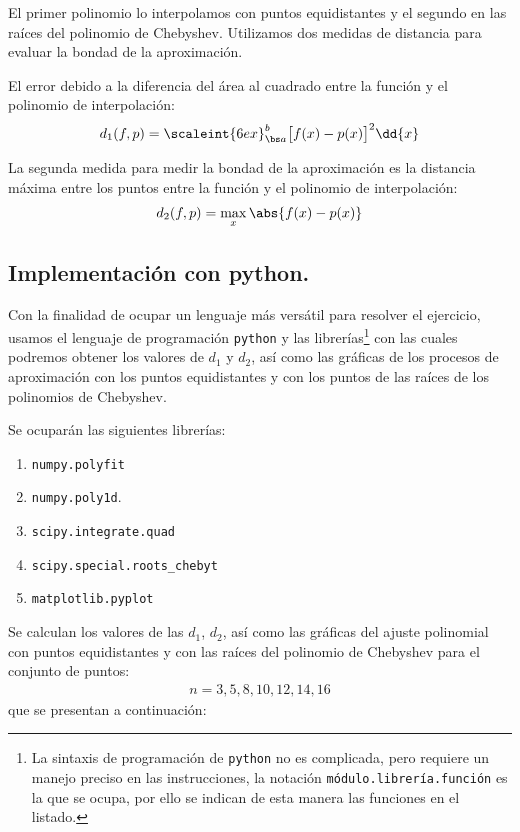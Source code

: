El primer polinomio lo interpolamos con puntos equidistantes y el segundo en las raíces del polinomio de Chebyshev. Utilizamos dos medidas de distancia para evaluar la bondad de la aproximación.

El error debido a la diferencia del área al cuadrado entre la función y el polinomio de interpolación:
\begin{align*}
d_{1} (f, p) = \scaleint{6ex}_{\bs a}^{b} \big[ f(x) - p(x) \big]^{2} \dd{x}
\end{align*}

La segunda medida para medir la bondad de la aproximación es la distancia máxima entre los puntos entre la función y el polinomio de interpolación:
\begin{align*}
d_{2} (f, p) = \max_{x} \abs{f(x) - p(x)}
\end{align*}

\subsection{Implementación con python.}

Con la finalidad de ocupar un lenguaje más versátil para resolver el ejercicio, usamos el lenguaje de programación \texttt{python} y las librerías\footnote{La sintaxis de programación de \texttt{python} no es complicada, pero requiere un manejo preciso en las instrucciones, la notación \texttt{módulo.librería.función} es la que se ocupa, por ello se indican de esta manera las funciones en el listado.} con las cuales podremos obtener los valores de $d_{1}$ y $d_{2}$, así como las gráficas de los procesos de aproximación con los puntos equidistantes y con los puntos de las raíces de los polinomios de Chebyshev.
\par
Se ocuparán las siguientes librerías:
\begin{enumerate}[label=\alph*)]
\item \texttt{numpy.polyfit}
\item \texttt{numpy.poly1d}.
\item \texttt{scipy.integrate.quad}
\item \texttt{scipy.special.roots\_chebyt}
\item \texttt{matplotlib.pyplot}
\end{enumerate}

Se calculan los valores de las $d_{1}$, $d_{2}$, así como las gráficas del ajuste polinomial con puntos equidistantes y con las raíces del polinomio de Chebyshev para el conjunto de puntos:
\begin{align*}
n = 3, 5, 8, 10, 12, 14, 16
\end{align*}
que se presentan a continuación:

